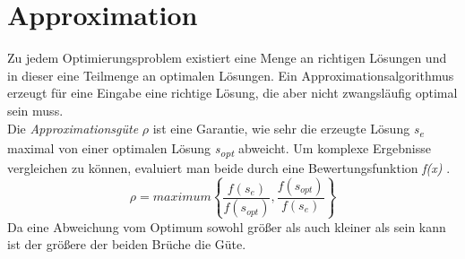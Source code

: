 \section{Approximation}

Zu jedem Optimierungsproblem existiert eine Menge an richtigen Lösungen und in dieser eine Teilmenge an optimalen Lösungen. 
Ein Approximationsalgorithmus erzeugt für eine Eingabe eine richtige Lösung, die aber nicht zwangsläufig optimal sein muss.\\
Die \emph{Approximationsgüte} $\rho$ ist eine Garantie, wie sehr die erzeugte Lösung \textit{s\textsubscript{e}} maximal von einer optimalen Lösung \textit{s\textsubscript{opt}} abweicht. Um komplexe Ergebnisse vergleichen zu können, evaluiert man beide durch eine Bewertungsfunktion \textit{f(x)} \cite{approxdef}.
\begin{equation}
\rho= maximum
\left\{
\frac{f(s_{e})}{f(s_{opt})},\frac{f(s_{opt})}{f(s_{e})}
\right\}
\end{equation}
Da eine Abweichung vom Optimum sowohl größer als auch kleiner als  \grqq{} sein kann ist der größere der beiden Brüche die Güte.

